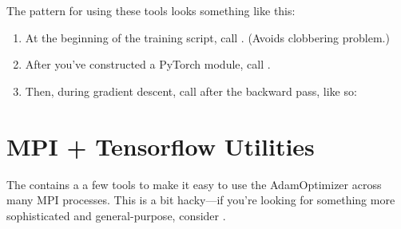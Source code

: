 \documentclass[letterpaper,10pt,english]{sphinxmanual}
\begin{document}
The pattern for using these tools looks something like this:
\begin{enumerate}
\def\theenumi{\arabic{enumi}}
\def\labelenumi{\theenumi )}
\makeatletter\def\p@enumii{\p@enumi \theenumi )}\makeatother
\item {} 
At the beginning of the training script, call . (Avoids clobbering problem.)

\item {} 
After you’ve constructed a PyTorch module, call .

\item {} 
Then, during gradient descent, call  after the backward pass, like so:

\end{enumerate}

\begin{sphinxVerbatim}[commandchars=\\\{\}]
  
   
\end{sphinxVerbatim}


\section{MPI + Tensorflow Utilities}
\label{\detokenize{utils/mpi:mpi-tensorflow-utilities}}
The  contains a a few tools to make it easy to use the AdamOptimizer across many MPI processes. This is a bit hacky—if you’re looking for something more sophisticated and general-purpose, consider .
\end{document}
